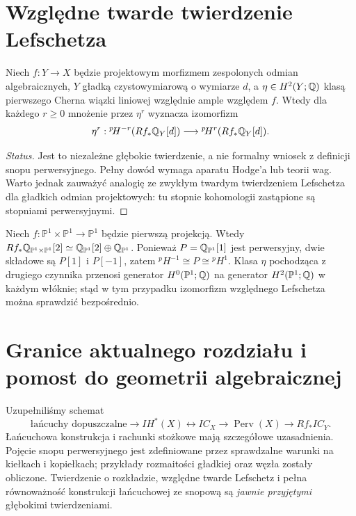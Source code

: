 \section{Względne twarde twierdzenie Lefschetza}
\begin{twierdzenie}
\label{thm:relative-hard-lefschetz-xiii}
Niech $f:Y\to X$ będzie projektowym morfizmem
zespolonych odmian algebraicznych, $Y$
gładką czystowymiarową o wymiarze $d$,
a $\eta\in H^2(Y;\mathbb{Q})$ klasą pierwszego Cherna
wiązki liniowej względnie ample względem $f$.
Wtedy dla każdego $r\ge0$ mnożenie przez
$\eta^r$ wyznacza izomorfizm
\[
\eta^r:{}^p\!H^{-r}(Rf_*\mathbb{Q}_Y[d])
\longrightarrow{}^p\!H^{r}(Rf_*\mathbb{Q}_Y[d]).
\]
\end{twierdzenie}
\begin{proof}[Status]
Jest to niezależne głębokie twierdzenie, a nie
formalny wniosek z definicji snopu perwersyjnego.
Pełny dowód wymaga aparatu Hodge'a lub teorii wag.
Warto jednak zauważyć analogię ze zwykłym twardym
twierdzeniem Lefschetza dla gładkich odmian
projektowych: tu stopnie kohomologii zastąpione
są stopniami perwersyjnymi.
\end{proof}
\begin{przyklad}
Niech $f:\mathbb P^1\times\mathbb P^1\to\mathbb P^1$
będzie pierwszą projekcją. Wtedy
$Rf_*\mathbb{Q}_{\mathbb P^1\times\mathbb P^1}[2]
\simeq\mathbb{Q}_{\mathbb P^1}[2]\oplus\mathbb{Q}_{\mathbb P^1}$.
Ponieważ $P=\mathbb{Q}_{\mathbb P^1}[1]$ jest perwersyjny,
dwie składowe są $P[1]$ i $P[-1]$, zatem
${}^p\!H^{-1}\cong P\cong{}^p\!H^{1}$.
Klasa $\eta$ pochodząca z drugiego czynnika
przenosi generator $H^0(\mathbb P^1;\mathbb{Q})$ na
generator $H^2(\mathbb P^1;\mathbb{Q})$ w każdym włóknie;
stąd w tym przypadku izomorfizm względnego
Lefschetza można sprawdzić bezpośrednio.
\end{przyklad}

\section{Granice aktualnego rozdziału i pomost do geometrii algebraicznej}
Uzupełniliśmy schemat
\[
\text{łańcuchy dopuszczalne}
\longrightarrow IH^*(X)
\longleftrightarrow IC_X
\longrightarrow\operatorname{Perv}(X)
\longrightarrow Rf_*IC_Y.
\]
Łańcuchowa konstrukcja i rachunki stożkowe
mają szczegółowe uzasadnienia. Pojęcie snopu
perwersyjnego jest zdefiniowane przez
sprawdzalne warunki na kiełkach i kopiełkach;
przykłady rozmaitości gładkiej oraz węzła
zostały obliczone. Twierdzenie o rozkładzie,
względne twarde Lefschetz i pełna równoważność
konstrukcji łańcuchowej ze snopową są
\emph{jawnie przyjętymi} głębokimi twierdzeniami.

